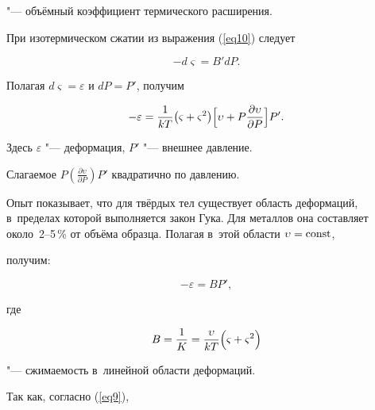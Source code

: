 "--- объёмный коэффициент термического расширения.



При изотермическом сжатии из выражения (\ref{eq10}) следует

\begin{equation}

\label{eq11}

-d\varsigma =B'dP.

\end{equation}



Полагая $d\varsigma =\varepsilon$ и $dP=P'$, получим

\begin{equation}

\label{eq12}

-\varepsilon =\frac1{kT}\bigl( \varsigma +\varsigma ^2\bigr)

\Bigl[ \upsilon +P\frac{\partial \upsilon }{\partial P} \Bigr]{P}'.

\end{equation}

Здесь $\varepsilon$ "--- деформация, $P'$ "--- внешнее давление. 

Слагаемое $P\left(\frac{\partial \upsilon}{\partial P}\right)P'$ квадратично по давлению. 





Опыт показывает, что для твёрдых тел существует область деформаций, в~пределах которой выполняется закон Гука. Для металлов она составляет около~2--5\,\% от объёма образца. Полагая в~этой области $\upsilon =\rm const$, 

получим:

\begin{equation}

 -\varepsilon =BP',

\end{equation}

где 

\begin{equation}

B=\frac1K=\frac{\upsilon }{kT}\Bigl( \varsigma +\varsigma ^2\Bigr) 

\end{equation}

"--- сжимаемость в~линейной области деформаций.



Так как, согласно (\ref{eq9}), 

$$

